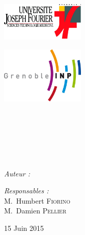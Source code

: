 \begin{titlepage}
\begin{center}

\begin{minipage}[t]{0.48\textwidth} %
  \begin{flushleft}
    \includegraphics [width=40mm]{images/ujf.jpg}
    \begin{spacing}{1.5}
    \end{spacing}
  \end{flushleft}
\end{minipage}
\begin{minipage}[t]{0.48\textwidth} %
  \begin{flushright}
    \includegraphics [width=40mm]{images/inp.jpg}
  \end{flushright}
\end{minipage} \\[1.5cm]

\textsc{\Large \reportsubject}\\[0.5cm]
\HRule \\[0.4cm]
{\huge \bfseries \reporttitle}\\[0.4cm]
\HRule \\[1.5cm]

\begin{minipage}[t]{0.3\textwidth} %
  \begin{flushleft} \large
    \emph{Auteur :}\\
    \reportauthor
  \end{flushleft}
\end{minipage}
\begin{minipage}[t]{0.6\textwidth} %
  \begin{flushright} \large
    \emph{Responsables :} \\
    M.~Humbert \textsc{Fiorino} \\
    M.~Damien \textsc{Pellier}
  \end{flushright}
\end{minipage}

\vfill

{\large 15 Juin 2015} %

\end{center}
\end{titlepage}